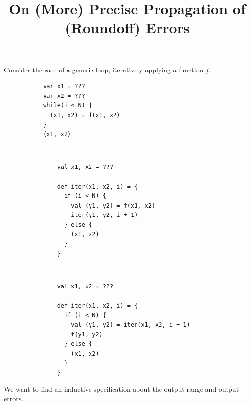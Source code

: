 \documentclass[10pt]{article}
\title{On (More) Precise Propagation of (Roundoff) Errors}
\author{}
\begin{document}
\maketitle



\section{}
Consider the case of a generic loop, iteratively applying a function $f$.
\begin{figure}[h!]
  \centering
  \lstset{numbers=none}
  \begin{subfigure}[b]{0.25\textwidth}
    \begin{lstlisting}
var x1 = ???
var x2 = ???
while(i < N) {
  (x1, x2) = f(x1, x2)
}
(x1, x2)
    \end{lstlisting}
  \end{subfigure}%
  ~ %
  \begin{subfigure}[b]{0.32\textwidth}
    \begin{lstlisting}
    val x1, x2 = ???

    def iter(x1, x2, i) = {
      if (i < N) {
        val (y1, y2) = f(x1, x2)
        iter(y1, y2, i + 1)
      } else {
        (x1, x2)
      }
    }
    \end{lstlisting}
  \end{subfigure}
  ~ %
  \begin{subfigure}[b]{0.32\textwidth}
    \begin{lstlisting}
    val x1, x2 = ???

    def iter(x1, x2, i) = {
      if (i < N) {
        val (y1, y2) = iter(x1, x2, i + 1)
        f(y1, y2)
      } else {
        (x1, x2)
      }
    }
    \end{lstlisting}
  \end{subfigure}
\end{figure}


We want to find an inductive specification about the output range and output errors.
\end{document}
